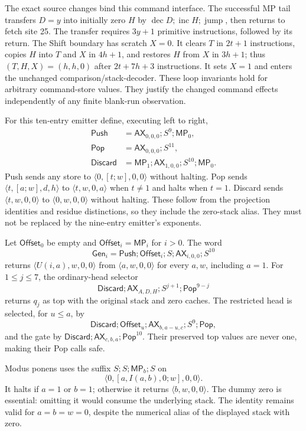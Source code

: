 The exact source changes bind this command interface. The successful MP
tail transfers $D=y$ into initially zero $H$ by
$\operatorname{dec}D;\operatorname{inc}H;\operatorname{jump}$,
then returns to fetch site 25. The transfer requires $3y+1$ primitive
instructions, followed by its return. The Shift boundary has scratch
$X=0$. It clears $T$ in $2t+1$ instructions, copies $H$ into $T$ and
$X$ in $4h+1$, and restores $H$ from $X$ in $3h+1$; thus
$(T,H,X)=(h,h,0)$ after $2t+7h+3$ instructions. It sets $X=1$
and enters the unchanged comparison/stack-decoder. These loop invariants
hold for arbitrary command-store values. They justify the changed
command effects independently of any finite blank-run observation.

For this ten-entry emitter define, executing left to right,
\[
 \begin{aligned}
 \mathsf{Push}&=\mathsf{AX}_{0,0,0};S^9;\mathsf{MP}_0,\\
 \mathsf{Pop}&=\mathsf{AX}_{0,0,0};S^{11},\\
 \mathsf{Discard}&=\mathsf{MP}_1;\mathsf{AX}_{1,0,0};S^{10};\mathsf{MP}_0.
 \end{aligned}
\]
Push sends any store to $\langle0,[t;w],0,0\rangle$ without halting.
Pop sends $\langle t,[a;w],d,h\rangle$ to
$\langle t,w,0,a\rangle$ when $t\ne1$ and halts when $t=1$.
Discard sends $\langle t,w,0,0\rangle$ to
$\langle0,w,0,0\rangle$ without halting. These follow from the projection
identities and residue distinctions, so they include the zero-stack alias.
They must not be replaced by the nine-entry emitter's exponents.

Let $\mathsf{Offset}_0$ be empty and $\mathsf{Offset}_i=\mathsf{MP}_i$
for $i>0$. The word
\[
 \mathsf{Gen}_i=\mathsf{Push};\mathsf{Offset}_i;S;
                     \mathsf{AX}_{i,0,0};S^{10}
\]
returns $\langle U(i,a),w,0,0\rangle$ from
$\langle a,w,0,0\rangle$ for every $a,w$, including $a=1$.
For $1\le j\le7$, the ordinary-head selector
\[
 \mathsf{Discard};\mathsf{AX}_{A,D,H};S^{j+1};
                              \mathsf{Pop}^{9-j}
\]
returns $q_j$ as top with the original stack and zero caches.
The restricted head is selected, for $u\le a$, by
\[
 \mathsf{Discard};\mathsf{Offset}_u;
                 \mathsf{AX}_{b,a-u,c};S^9;\mathsf{Pop},
\]
and the gate by
$\mathsf{Discard};\mathsf{AX}_{c,b,a};\mathsf{Pop}^{10}$.
Their preserved top values are never one, making their Pop calls safe.

Modus ponens uses the suffix $S;S;\mathsf{MP}_b;S$ on
\[
             \langle0,[a,I(a,b),0;w],0,0\rangle.
\]
It halts if $a=1$ or $b=1$; otherwise it returns
$\langle b,w,0,0\rangle$. The dummy zero is essential: omitting it
would consume the underlying stack. The identity remains valid for
$a=b=w=0$, despite the numerical alias of the displayed stack with zero.


